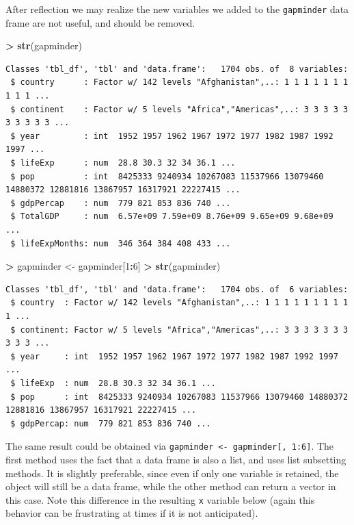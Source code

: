 \documentclass[]{krantz}
\makeatletter
\newenvironment{Shaded}{\begin{snugshade}}{\end{snugshade}}
\newcommand{\KeywordTok}[1]{\textcolor[rgb]{0.27,0.27,0.27}{\textbf{#1}}}
\newcommand{\DecValTok}[1]{\textcolor[rgb]{0.06,0.06,0.06}{#1}}
\newcommand{\StringTok}[1]{\textcolor[rgb]{0.5,0.5,0.5}{#1}}
\newcommand{\OperatorTok}[1]{\textcolor[rgb]{0.43,0.43,0.43}{\textbf{#1}}}
\newcommand{\NormalTok}[1]{#1}
\newenvironment{kframe}{%
\medskip{}
\setlength{\fboxsep}{.8em}
 \def\at@end@of@kframe{}%
 \ifinner\ifhmode%
  \def\at@end@of@kframe{\end{minipage}}%
  \begin{minipage}{\columnwidth}%
 \fi\fi%
 \def\FrameCommand##1{\hskip\@totalleftmargin \hskip-\fboxsep
 \colorbox{shadecolor}{##1}\hskip-\fboxsep
     \hskip-\linewidth \hskip-\@totalleftmargin \hskip\columnwidth}%
 \MakeFramed {\advance\hsize-\width
   \@totalleftmargin\z@ \linewidth\hsize
   \@setminipage}}%
 {\par\unskip\endMakeFramed%
 \at@end@of@kframe}
\renewenvironment{Shaded}{\begin{kframe}}{\end{kframe}}
\makeatother
\begin{document}
After reflection we may realize the new variables we added to the
\texttt{gapminder} data frame are not useful, and should be removed.

\begin{Shaded}
\begin{Highlighting}[]
\OperatorTok{>}\StringTok{ }\KeywordTok{str}\NormalTok{(gapminder)}
\end{Highlighting}
\end{Shaded}

\begin{verbatim}
Classes 'tbl_df', 'tbl' and 'data.frame':   1704 obs. of  8 variables:
 $ country      : Factor w/ 142 levels "Afghanistan",..: 1 1 1 1 1 1 1 1 1 1 ...
 $ continent    : Factor w/ 5 levels "Africa","Americas",..: 3 3 3 3 3 3 3 3 3 3 ...
 $ year         : int  1952 1957 1962 1967 1972 1977 1982 1987 1992 1997 ...
 $ lifeExp      : num  28.8 30.3 32 34 36.1 ...
 $ pop          : int  8425333 9240934 10267083 11537966 13079460 14880372 12881816 13867957 16317921 22227415 ...
 $ gdpPercap    : num  779 821 853 836 740 ...
 $ TotalGDP     : num  6.57e+09 7.59e+09 8.76e+09 9.65e+09 9.68e+09 ...
 $ lifeExpMonths: num  346 364 384 408 433 ...
\end{verbatim}

\begin{Shaded}
\begin{Highlighting}[]
\OperatorTok{>}\StringTok{ }\NormalTok{gapminder <-}\StringTok{ }\NormalTok{gapminder[}\DecValTok{1}\OperatorTok{:}\DecValTok{6}\NormalTok{]}
\OperatorTok{>}\StringTok{ }\KeywordTok{str}\NormalTok{(gapminder)}
\end{Highlighting}
\end{Shaded}

\begin{verbatim}
Classes 'tbl_df', 'tbl' and 'data.frame':   1704 obs. of  6 variables:
 $ country  : Factor w/ 142 levels "Afghanistan",..: 1 1 1 1 1 1 1 1 1 1 ...
 $ continent: Factor w/ 5 levels "Africa","Americas",..: 3 3 3 3 3 3 3 3 3 3 ...
 $ year     : int  1952 1957 1962 1967 1972 1977 1982 1987 1992 1997 ...
 $ lifeExp  : num  28.8 30.3 32 34 36.1 ...
 $ pop      : int  8425333 9240934 10267083 11537966 13079460 14880372 12881816 13867957 16317921 22227415 ...
 $ gdpPercap: num  779 821 853 836 740 ...
\end{verbatim}

The same result could be obtained via
\texttt{gapminder\ \textless{}-\ gapminder{[},\ 1:6{]}}. The first
method uses the fact that a data frame is also a list, and uses list
subsetting methods. It is slightly preferable, since even if only one
variable is retained, the object will still be a data frame, while the
other method can return a vector in this case. Note this difference in
the resulting \texttt{x} variable below (again this behavior can be
frustrating at times if it is not anticipated).
\end{document}
